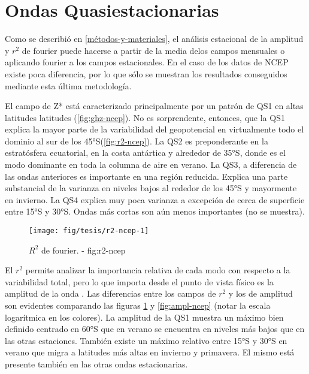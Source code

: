 \documentclass[spanish,a4paper]{book}
\begin{document}
\section{Ondas Quasiestacionarias}\label{ondas-quasiestacionarias}

Como se describió en \autoref{métodos-y-materiales}, el análisis
estacional de la amplitud y \(r^2\) de fourier puede hacerse a partir de
la media delos campos mensuales o aplicando fourier a los campos
estacionales. En el caso de los datos de NCEP existe poca diferencia,
por lo que sólo se muestran los resultados conseguidos mediante esta
última metodología.

El campo de Z* está caracterizado principalmente por un patrón de QS1 en
altas latitudes latitudes (\autoref{fig:ghz-ncep}). No es sorprendente,
entonces, que la QS1 explica la mayor parte de la variabilidad del
geopotencial en virtualmente todo el dominio al sur de los
45°S(\autoref{fig:r2-ncep}). La QS2 es preponderante en la estratósfera
ecuatorial, en la costa antártica y alrededor de 35°S, donde es el modo
dominante en toda la columna de aire en verano. La QS3, a diferencia de
las ondas anteriores es importante en una región reducida. Explica una
parte substancial de la varianza en niveles bajos al rededor de los 45°S
y mayormente en invierno. La QS4 explica muy poca varianza a excepción
de cerca de superficie entre 15°S y 30°S. Ondas más cortas son aún menos
importantes (no se muestra).

\begin{landscape}\begin{figure}

{\centering \texttt{[image: fig/tesis/r2-ncep-1]} 

}

\caption{$R^2$ de fourier. - fig:r2-ncep}\label{fig:r2-ncep}
\end{figure}
\end{landscape}

El \(r^2\) permite analizar la importancia relativa de cada modo con
respecto a la variabilidad total, pero lo que importa desde el punto de
vista físico es la amplitud de la onda
. Las diferencias entre
los campos de \(r^2\) y los de amplitud son evidentes comparando las
figuras \ref{fig:r2-ncep} y \ref{fig:ampl-ncep} (notar la escala
logarítmica en los colores). La amplitud de la QS1 muestra un máximo
bien definido centrado en 60°S que en verano se encuentra en niveles más
bajos que en las otras estaciones. También existe un máximo relativo
entre 15°S y 30°S en verano que migra a latitudes más altas en invierno
y primavera. El mismo está presente también en las otras ondas
estacionarias.
\end{document}
